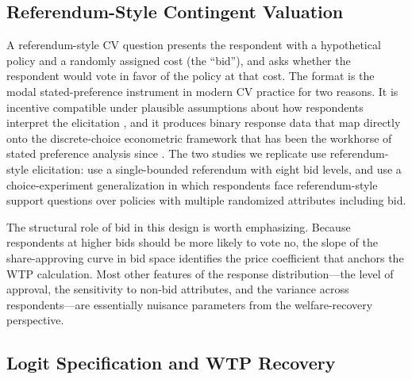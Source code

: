 \documentclass[12pt]{article}
\begin{document}
\subsection{Referendum-Style Contingent Valuation}\label{sec:bg-cv}

A referendum-style CV question presents the respondent with a hypothetical
policy and a randomly assigned cost (the ``bid''), and asks whether the
respondent would vote in favor of the policy at that cost. The format is
the modal stated-preference instrument in modern CV practice for two
reasons. It is incentive compatible under plausible assumptions about how
respondents interpret the elicitation \parencite{Carson2007}, and it
produces binary response data that map directly onto the discrete-choice
econometric framework that has been the workhorse of stated preference
analysis since \textcite{Hanemann1984}. The two studies we replicate use
referendum-style elicitation: \textcite{Aldy2012} use a single-bounded
referendum with eight bid levels, and \textcite{Giguere2020} use a
choice-experiment generalization in which respondents face referendum-style
support questions over policies with multiple randomized attributes
including bid.

The structural role of bid in this design is worth emphasizing. Because
respondents at higher bids should be more likely to vote no, the slope of
the share-approving curve in bid space identifies the price coefficient
that anchors the WTP calculation. Most other features of the response
distribution---the level of approval, the sensitivity to non-bid
attributes, and the variance across respondents---are essentially
nuisance parameters from the welfare-recovery perspective.

\subsection{Logit Specification and WTP Recovery}\label{sec:bg-logit}
\end{document}
